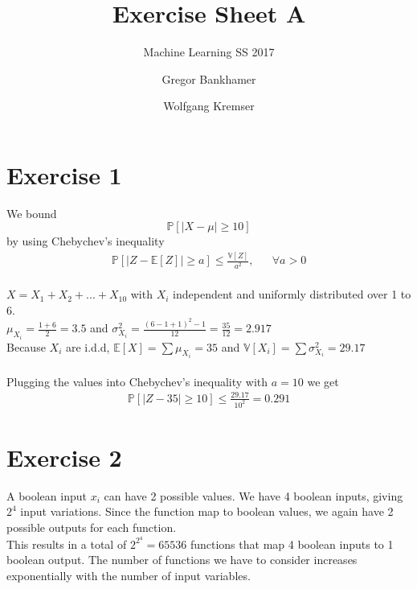 \documentclass[12pt]{scrartcl}
\begin{document}
		
\title{Exercise Sheet A}
\subtitle{Machine Learning SS 2017}
\author{Gregor Bankhamer \and Wolfgang Kremser}
\date{}
\maketitle


\section*{Exercise 1}
We bound 
\begin{equation*}
	\mathbb{P}[|X-\mu| \geq 10]
\end{equation*}
by using Chebychev's inequality
\begin{equation*} 
	\begin{aligned}
		 \mathbb{P}[|Z - \mathbb{E}[Z]| \geq a] \leq \frac{\mathbb{V}[Z]}{a^2}, &&\forall a > 0
	\end{aligned}
\end{equation*}
\\
$X = X_1 + X_2 + ... + X_{10}$ with $X_i$ independent and uniformly distributed over 1 to 6.\\
$\mu_{X_i} = \frac{1+6}{2} = 3.5$ and $\sigma^2_{X_i} = \frac{(6-1+1)^2-1}{12} = \frac{35}{12} = 2.917$\\

\noindent Because $X_i$ are i.d.d, $\mathbb{E}[X] = \sum \mu_{X_i} = 35$ and $\mathbb{V}[X_i] = \sum \sigma^2_{X_i} = 29.17$\\
\\
Plugging the values into Chebychev's inequality with $a=10$ we get
\begin{equation*} 
\begin{aligned}
\mathbb{P}[|Z - 35| \geq 10] \leq \frac{29.17}{10^2} = 0.291
\end{aligned}
\end{equation*}

\section*{Exercise 2}
A boolean input $x_i$ can have 2 possible values. We have 4 boolean inputs, giving $2^4$ input variations. Since the function map to boolean values, we again have 2 possible outputs for each function. \\
This results in a total of $2^{2^4} = 65536$ functions that map 4 boolean inputs to 1 boolean output. The number of functions we have to consider increases exponentially with the number of input variables.
\end{document}
